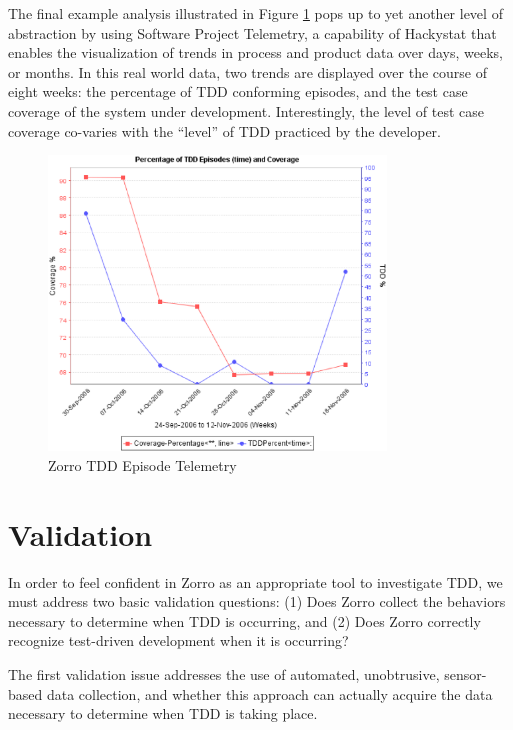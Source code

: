 \documentclass[smallextended]{svjour3}     %
\begin{document}
The final example analysis illustrated in Figure
\ref{fig:Analysis-Telemetry} pops up to yet another level of abstraction by
using Software Project Telemetry, a capability of Hackystat that enables
the visualization of trends in process and product data over days, weeks,
or months.  In this real world data, two trends are displayed over the
course of eight weeks: the percentage of TDD conforming episodes, and the
test case coverage of the system under development.  Interestingly, the
level of test case coverage co-varies with the ``level'' of TDD practiced
by the developer.

\begin{figure}[th]
  \center
  \includegraphics[width=0.80\textwidth]{zorro-tdd-coverage-2.eps}
  \caption{Zorro TDD Episode Telemetry}
  \label{fig:Analysis-Telemetry}
\end{figure} 


\section{Validation}
\label{sec:validation}

In order to feel confident in Zorro as an appropriate tool to investigate
TDD, we must address two basic validation questions: (1) Does Zorro collect
the behaviors necessary to determine when TDD is occurring, and (2) Does
Zorro correctly recognize test-driven development when it is occurring?

The first validation issue addresses the use of automated, unobtrusive,
sensor-based data collection, and whether this approach can actually
acquire the data necessary to determine when TDD is taking place.
\end{document}
